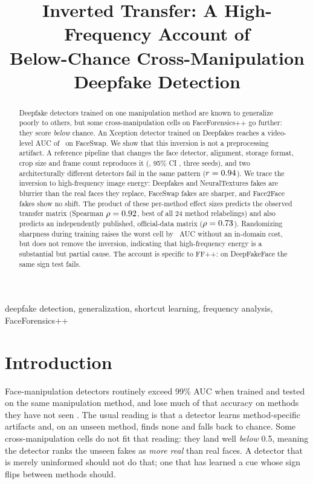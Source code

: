 \documentclass[conference]{IEEEtran}
\begin{document}
\title{Inverted Transfer: A High-Frequency Account of\\Below-Chance Cross-Manipulation Deepfake Detection}

\author{
}

\maketitle

\begin{abstract}
Deepfake detectors trained on one manipulation method are known to generalize
poorly to others, but some cross-manipulation cells on FaceForensics++ go
further: they score \emph{below} chance. An Xception detector trained on
Deepfakes reaches a video-level AUC of \curdffs\ on FaceSwap. We show that this
inversion is not a preprocessing artifact. A reference pipeline that changes
the face detector, alignment, storage format, crop size and frame count
reproduces it (, 95\% CI , three seeds), and two
architecturally different detectors fail in the same pattern ($r=0.94$). We
trace the inversion to high-frequency image energy: Deepfakes and
NeuralTextures fakes are blurrier than the real faces they replace, FaceSwap
fakes are sharper, and Face2Face fakes show no shift. The product of these
per-method effect sizes predicts the observed transfer matrix (Spearman
$\rho=0.92$, best of all 24 method relabelings) and also predicts an
independently published, official-data matrix ($\rho=0.73$). Randomizing
sharpness during training raises the worst cell by \augdeltadffs\ AUC without
an in-domain cost, but does not remove the inversion, indicating that
high-frequency energy is a substantial but partial cause. The account is
specific to FF++: on DeepFakeFace the same sign test fails.
\end{abstract}

\begin{IEEEkeywords}
deepfake detection, generalization, shortcut learning, frequency analysis, FaceForensics++
\end{IEEEkeywords}

\section{Introduction}

Face-manipulation detectors routinely exceed 99\% AUC when trained and tested
on the same manipulation method, and lose much of that accuracy on methods
they have not seen \cite{rossler2019ffpp,li2020facexray}. The usual reading is
that a detector learns method-specific artifacts and, on an unseen method,
finds none and falls back to chance. Some cross-manipulation cells do not fit
that reading: they land well \emph{below} 0.5, meaning the detector ranks the
unseen fakes as \emph{more real} than real faces. A detector that is merely
uninformed should not do that; one that has learned a cue whose sign flips
between methods should.
\end{document}
